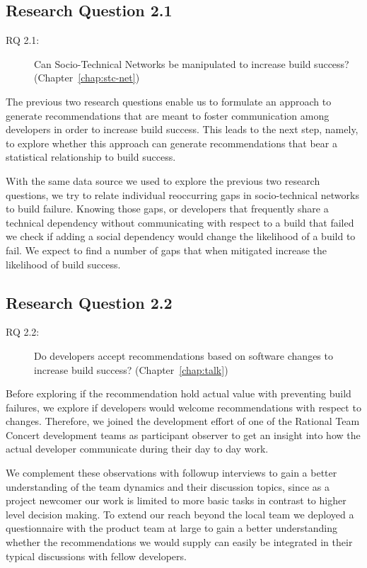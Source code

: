 \subsection{Research Question 2.1}
\begin{description}
  \item[RQ 2.1:] Can Socio-Technical Networks be manipulated to increase build success? (Chapter~\ref{chap:stc-net})
\end{description}
The previous two research questions enable us to formulate an approach to generate recommendations that are meant to foster communication among developers in order to increase build success.
This leads to the next step, namely, to explore whether this approach can generate recommendations that bear a statistical relationship to build success.

With the same data source we used to explore the previous two research questions, we try to relate individual reoccurring gaps in socio-technical networks to build failure.
Knowing those gaps, or developers that frequently share a technical dependency without communicating with respect to a build that failed we check if adding a social dependency would change the likelihood of a build to fail.
We expect to find a number of gaps that when mitigated increase the likelihood of build success.

\subsection{Research Question 2.2}
\begin{description}
  \item[RQ 2.2:] Do developers accept recommendations based on software changes to increase build success? (Chapter~\ref{chap:talk})
\end{description}
Before exploring if the recommendation hold actual value with preventing build failures, we explore if developers would welcome recommendations with respect to changes.
Therefore, we joined the development effort of one of the Rational Team Concert development teams as participant observer to get an insight into how the actual developer communicate during their day to day work.

We complement these observations with followup interviews to gain a better understanding of the team dynamics and their discussion topics, since as a project newcomer our work is limited to more basic tasks in contrast to higher level decision making.
To extend our reach beyond the local team we deployed a questionnaire with the product team at large to gain a better understanding whether the recommendations we would supply can easily be integrated in their typical discussions with fellow developers.

